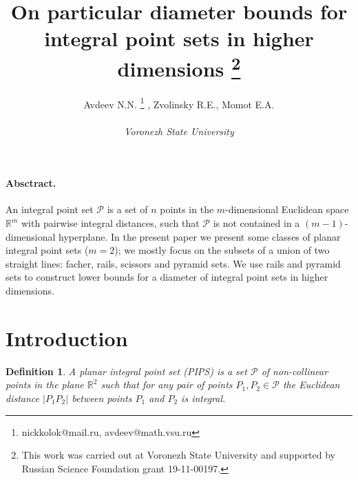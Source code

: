 \documentclass[12pt]{article}
\theoremstyle{theorem}
\theoremstyle{dfn}
\newtheorem{dfn}{Definition}
\theoremstyle{remark}
\begin{document}






\title{
	On particular diameter bounds for integral point sets in higher dimensions
	\footnote{
		This work was carried out at Voronezh State University and supported by Russian Science
		Foundation grant 19-11-00197.
	}
}

\author{
	Avdeev N.N.
	\footnote{nickkolok@mail.ru, avdeev@math.vsu.ru}
	, Zvolinsky R.E., Momot E.A.
	\\
	\\
	\emph{Voronezh State University}
}

\maketitle


\paragraph{Absctract.}
	An integral point set $\mathcal{P}$ is a set of $n$ points in
	the $m$-dimensional Euclidean space $\mathbb{R}^{m}$ with pairwise
	integral distances,
	such that $\mathcal{P}$ is not contained in a $(m-1)$-dimensional hyperplane.
	In the present paper we present some classes of planar integral point sets ($m=2$);
	we mostly focus on the subsets of a union of two straight lines:
	facher, rails, scissors and pyramid sets.
	We use rails and pyramid sets to construct lower bounds for a diameter
	of integral point sets in higher dimensions.

\section{Introduction}
\label{sec:intro}



\begin{dfn}\label{dfn1}
	A planar integral point set (PIPS) is a set $\mathcal{P}$
	of non-collinear points in the plane $\mathbb{R}^{2}$ such that
	for any pair of points $P_{1}, P_{2} \in \mathcal{P}$
	the Euclidean distance $|P_{1}P_{2}|$
	between points $P_{1}$ and $P_{2}$ is integral.
\end{dfn}
\end{document}
